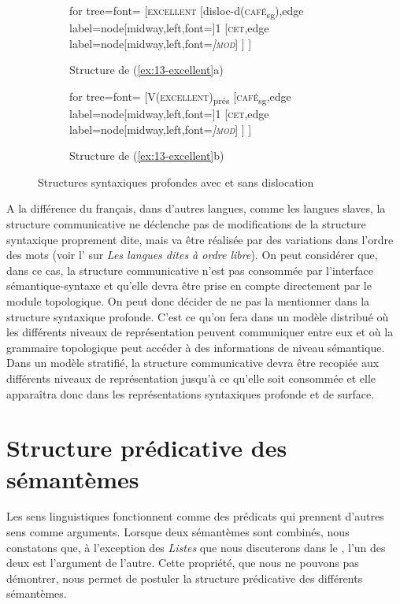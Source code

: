 {\begin{figure}[H]
	\begin{subfigure}[b]{0.5\textwidth}
		\centering
		\begin{forest} for tree={font=\normalfont}
			[\textsc{excellent}
				[disloc-d(\textsc{café}\textsubscript{sg}),edge label={node[midway,left,font=\footnotesize]{1}}
					[\textsc{cet},edge label={node[midway,left,font=\footnotesize\itshape]{\textsc{mod}}}]
				]
			]
		\end{forest}
		\caption{Structure de (\ref{ex:13-excellent}a)}
	\end{subfigure}%
	\hfill
	\begin{subfigure}[b]{0.5\textwidth}
		\centering
		\begin{forest} for tree={font=\normalfont}
			[V(\textsc{excellent})\textsubscript{prés}
				[\textsc{café}\textsubscript{sg},edge label={node[midway,left,font=\footnotesize]{1}}
					[\textsc{cet},edge label={node[midway,left,font=\footnotesize\itshape]{\textsc{mod}}}]
				]
			]
		\end{forest}
		\caption{Structure de (\ref{ex:13-excellent}b)}
	\end{subfigure}
\caption{Structures syntaxiques profondes avec et sans dislocation\label{fig:13-excellent}}
\end{figure}

A la différence du français, dans d’autres langues, comme les langues slaves, la structure communicative ne déclenche pas de modifications de la structure syntaxique proprement dite, mais va être réalisée par des variations dans l’ordre des mots (voir l’ sur \textit{Les langues dites à ordre libre}). On peut considérer que, dans ce cas, la structure communicative n’est pas consommée par l’interface sémantique-syntaxe et qu’elle devra être prise en compte directement par le module topologique. On peut donc décider de ne pas la mentionner dans la structure syntaxique profonde. C’est ce qu’on fera dans un modèle distribué où les différents niveaux de représentation peuvent communiquer entre eux et où la grammaire topologique peut accéder à des informations de niveau sémantique. Dans un modèle stratifié, la structure communicative devra être recopiée aux différents niveaux de représentation jusqu’à ce qu’elle soit consommée et elle apparaîtra donc dans les représentations syntaxiques profonde et de surface.}

\section{Structure prédicative des sémantèmes}\label{sec:13-argument}\largerpage
Les sens linguistiques fonctionnent comme des prédicats qui prennent d’autres sens comme arguments. Lorsque deux sémantèmes sont combinés, nous constatons que, à l'exception des \textit{Listes} que nous discuterons dans le , l’un des deux est l’argument de l’autre. Cette propriété, que nous ne pouvons pas démontrer, nous permet de postuler la structure prédicative des différents sémantèmes. 

